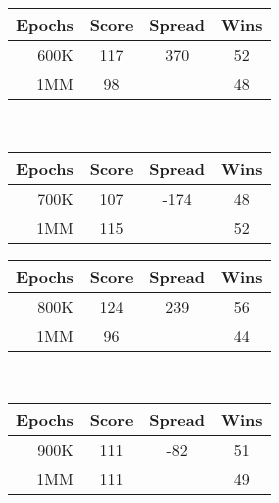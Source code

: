\begin{table}
\begin{tabular}{|r|c|c|c|}
	\hline
	\textbf{Epochs} & \textbf{Score} & \textbf{Spread} & \textbf{Wins}
	\\\hline
	600K & 117 & 370 & 52
	\\\hline
	1MM & 98 & \textemdash & 48
	\\\hline
\end{tabular}
~
\begin{tabular}{|r|c|c|c|}
	\hline
	\textbf{Epochs} & \textbf{Score} & \textbf{Spread} & \textbf{Wins}
	\\\hline
	700K & 107 & -174 & 48
	\\\hline
	1MM & 115 & \textemdash & 52
	\\\hline
\end{tabular}

\begin{tabular}{|r|c|c|c|}
	\hline
	\textbf{Epochs} & \textbf{Score} & \textbf{Spread} & \textbf{Wins}
	\\\hline
	800K & 124 & 239 & 56
	\\\hline
	1MM & 96 & \textemdash & 44
	\\\hline
\end{tabular}
~
\begin{tabular}{|r|c|c|c|}
	\hline
	\textbf{Epochs} & \textbf{Score} & \textbf{Spread} & \textbf{Wins}
	\\\hline
	900K & 111 & -82 & 51
	\\\hline
	1MM & 111 & \textemdash & 49
	\\\hline
\end{tabular}



\end{table}

